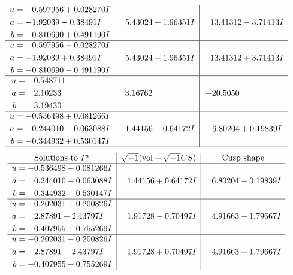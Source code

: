 \documentclass[1p]{elsarticle_modified}
\theoremstyle{definition}
\newcommand{\I}{\sqrt{-1}}
\begin{document}
$$\begin{array}{c|c|c}
\begin{aligned}
u &= \phantom{-}0.597956 + 0.028270 I \\
a &= -1.92039 - 0.38491 I \\
b &= -0.810690 + 0.491190 I\end{aligned}
 & \phantom{-}5.43024 + 1.96351 I & \phantom{-}13.41312 - 3.71413 I \\ \hline\begin{aligned}
u &= \phantom{-}0.597956 - 0.028270 I \\
a &= -1.92039 + 0.38491 I \\
b &= -0.810690 - 0.491190 I\end{aligned}
 & \phantom{-}5.43024 - 1.96351 I & \phantom{-}13.41312 + 3.71413 I \\ \hline\begin{aligned}
u &= -0.548711\phantom{ +0.000000I} \\
a &= \phantom{-}2.10233\phantom{ +0.000000I} \\
b &= \phantom{-}3.19430\phantom{ +0.000000I}\end{aligned}
 & \phantom{-}3.16762\phantom{ +0.000000I} & -20.5050\phantom{ +0.000000I} \\ \hline\begin{aligned}
u &= -0.536498 + 0.081266 I \\
a &= \phantom{-}0.244010 - 0.063088 I \\
b &= -0.344932 + 0.530147 I\end{aligned}
 & \phantom{-}1.44156 - 0.64172 I & \phantom{-}6.80204 + 0.19839 I\\
 \hline 
 \end{array}$$\newpage$$\begin{array}{c|c|c}  
\text{Solutions to }I^u_{1}& \I (\text{vol} + \sqrt{-1}CS) & \text{Cusp shape}\\
 \hline 
\begin{aligned}
u &= -0.536498 - 0.081266 I \\
a &= \phantom{-}0.244010 + 0.063088 I \\
b &= -0.344932 - 0.530147 I\end{aligned}
 & \phantom{-}1.44156 + 0.64172 I & \phantom{-}6.80204 - 0.19839 I \\ \hline\begin{aligned}
u &= -0.202031 + 0.200826 I \\
a &= \phantom{-}2.87891 + 2.43797 I \\
b &= -0.407955 + 0.755269 I\end{aligned}
 & \phantom{-}1.91728 - 0.70497 I & \phantom{-}4.91663 - 1.79667 I \\ \hline\begin{aligned}
u &= -0.202031 - 0.200826 I \\
a &= \phantom{-}2.87891 - 2.43797 I \\
b &= -0.407955 - 0.755269 I\end{aligned}
 & \phantom{-}1.91728 + 0.70497 I & \phantom{-}4.91663 + 1.79667 I\\
 \hline 
 \end{array}$$\newpage\newpage\renewcommand{\arraystretch}{1}
\end{document}
